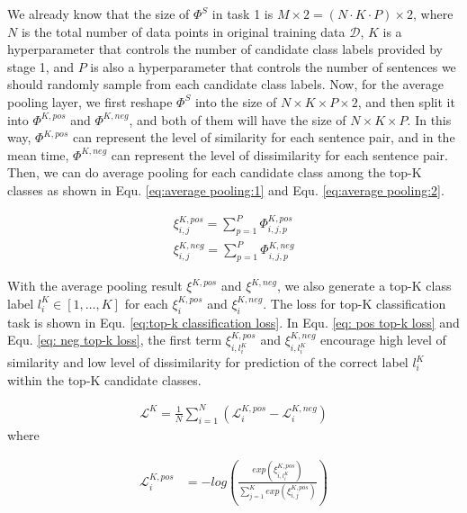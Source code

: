 \documentclass[letterpaper]{article} %
\begin{document}
  We  already  know  that the size of ${\Phi}^S$ in task 1 is $M\times 2=(N\cdot
  K\cdot  P)\times  2$, where $N$ is the total number of data points in original
  training  data $\mathcal{D}$, $K$ is a hyperparameter that controls the number
  of   candidate   class  labels  provided  by  stage  1,  and  $P$  is  also  a
  hyperparameter that controls the number of sentences we should randomly sample
  from each candidate class labels. Now, for the average pooling layer, we first
  reshape  ${\Phi}^S$  into  the  size  of $N\times K\times P\times 2$, and then
  split  it  into  ${\Phi}^{K,pos}$  and ${\Phi}^{K,neg}$, and both of them will
  have  the  size  of  $N\times  K\times  P$.  In this way, ${\Phi}^{K,pos}$ can
  represent  the  level  of  similarity  for each sentence pair, and in the mean
  time,  ${\Phi}^{K,neg}$  can  represent  the  level  of dissimilarity for each
  sentence  pair. Then, we can do average pooling for each candidate class among
  the  top-K  classes  as  shown  in  Equ.  \ref{eq:average  pooling:1} and Equ.
  \ref{eq:average pooling:2}.

  \begin{align}
    {\xi}_{i,j}^{K,pos} = \sum_{p=1}^{P}{\varPhi}_{i,j,p}^{K,pos} \label{eq:average pooling:1}\\
    {\xi}_{i,j}^{K,neg} = \sum_{p=1}^{P}{\varPhi}_{i,j,p}^{K,neg}
    \label{eq:average pooling:2}
  \end{align}

  With  the  average pooling result ${\xi}^{K,pos}$ and ${\xi}^{K,neg}$, we also
  generate   a   top-K   class   label   $l^{K}_i\in   [1,\dots,K]$   for   each
  ${\xi}^{K,pos}_{i}$ and ${\xi}^{K,neg}_{i}$. The loss for top-K classification
  task is shown in Equ. \ref{eq:top-k classification loss}. In Equ. \ref{eq: pos
  top-k   loss}   and   Equ.   \ref{eq:   neg   top-k   loss},  the  first  term
  $\xi_{i,l^{K}_{i}}^{K,pos}$  and  $\xi_{i,l^{K}_{i}}^{K,neg}$  encourage  high
  level  of  similarity  and  low  level  of dissimilarity for prediction of the
  correct label $l^{K}_i$ within the top-K candidate classes.

  \begin{align}
    \mathcal{L}^{K} = \frac{1}{N}\sum_{i=1}^{N}(\mathcal{L}^{K,pos}_{i} - \mathcal{L}^{K,neg}_{i})
    \label{eq:top-k classification loss}
  \end{align}
  where

  \begin{equation}
    \begin{aligned}
      \mathcal{L}^{K,pos}_{i} &= -log(\frac{exp(\xi_{i,l^{K}_{i}}^{K,pos})}{\sum_{j=1}^{K}exp(\xi_{i,j}^{K,pos})})
      \label{eq: pos top-k loss}
    \end{aligned}
  \end{equation}
\end{document}
